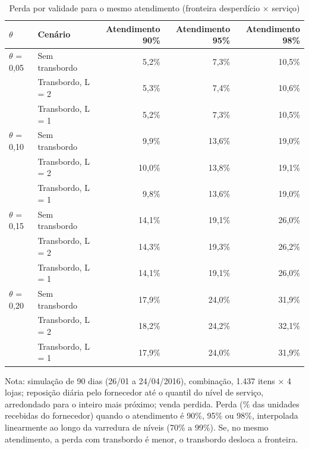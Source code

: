 \begin{table}[htbp]
\centering
\small
\caption{Perda por validade para o mesmo atendimento (fronteira desperdício × serviço)}
\label{tab:tb_fronteira}
\begin{tabular}{llrrr}
\toprule
$\theta$ & Cenário & Atendimento 90\% & Atendimento 95\% & Atendimento 98\% \\
\midrule
$\theta$ = 0,05 & Sem transbordo & 5,2\% & 7,3\% & 10,5\% \\
 & Transbordo, L = 2 & 5,3\% & 7,4\% & 10,6\% \\
 & Transbordo, L = 1 & 5,2\% & 7,3\% & 10,5\% \\
\addlinespace
$\theta$ = 0,10 & Sem transbordo & 9,9\% & 13,6\% & 19,0\% \\
 & Transbordo, L = 2 & 10,0\% & 13,8\% & 19,1\% \\
 & Transbordo, L = 1 & 9,8\% & 13,6\% & 19,0\% \\
\addlinespace
$\theta$ = 0,15 & Sem transbordo & 14,1\% & 19,1\% & 26,0\% \\
 & Transbordo, L = 2 & 14,3\% & 19,3\% & 26,2\% \\
 & Transbordo, L = 1 & 14,1\% & 19,1\% & 26,0\% \\
\addlinespace
$\theta$ = 0,20 & Sem transbordo & 17,9\% & 24,0\% & 31,9\% \\
 & Transbordo, L = 2 & 18,2\% & 24,2\% & 32,1\% \\
 & Transbordo, L = 1 & 17,9\% & 24,0\% & 31,9\% \\
\bottomrule
\end{tabular}
\par\smallskip
{\footnotesize Nota: simulação de 90 dias (26/01 a 24/04/2016), combinação, 1.437 itens × 4 lojas; reposição diária pelo fornecedor até o quantil do nível de serviço, arredondado para o inteiro mais próximo; venda perdida. Perda (\% das unidades recebidas do fornecedor) quando o atendimento é 90\%, 95\% ou 98\%, interpolada linearmente ao longo da varredura de níveis (70\% a 99\%). Se, no mesmo atendimento, a perda com transbordo é menor, o transbordo desloca a fronteira.}
\end{table}
